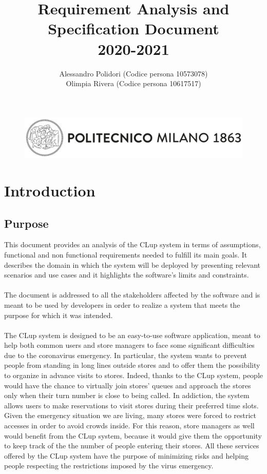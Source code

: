 \documentclass{article}
\title{ Requirement Analysis and Specification Document\\2020-2021}
\author{Alessandro Polidori (Codice persona 10573078)\\Olimpia Rivera (Codice persona 10617517)}
\date{}
\begin{document}
\renewcommand{\labelitemi}{\normalfont -}

\begin{figure}[]
  \includegraphics[width=\linewidth]{logo_politecnico.png}
  
\end{figure}
\maketitle
\tableofcontents{}

\newpage

\section{Introduction}

\subsection{Purpose}
This document provides an analysis of the CLup system in terms of assumptions, functional and non functional requirements needed to fulfill its main goals. It describes the domain in which the system will be deployed by presenting relevant scenarios and use cases and it highlights the software’s limits and constraints.\\
\smallskip\\
The document is addressed to all the stakeholders affected by the software and is meant to be used by developers in order to realize a system that meets the purpose for which it was intended.\\
\smallskip\\
The CLup system is designed to be an easy-to-use software application, meant to help both common users and store managers to face some significant difficulties due to the coronavirus emergency. In particular, the system wants to prevent people from standing in long lines outside stores and to offer them the possibility to organize in advance visits to stores. Indeed, thanks to the CLup system, people would have the chance to virtually join stores' queues and approach the stores only when their turn number is close to being called. In addiction, the system allows users to make reservations to visit stores during their preferred time slots. Given the emergency situation we are living, many stores were forced to restrict accesses in order to avoid crowds inside. For this reason, store managers as well would benefit from the CLup system, because it would give them the opportunity to keep track of the the number of people entering their stores. All these services offered by the CLup system have the purpose of minimizing risks and helping people respecting the restrictions imposed by the virus emergency.
\end{document}
